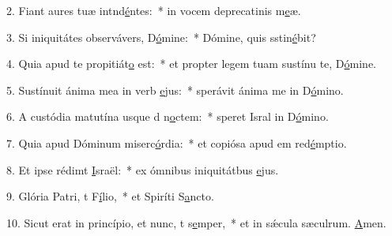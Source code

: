 2. Fiant aures tuæ intnd\uline{é}ntes:~* in vocem deprecatinis m\uline{e}æ.\par 
3. Si iniquitátes observávers, D\uline{ó}mine:~* Dómine, quis sstin\uline{é}bit?\par 
4. Quia apud te propitiát\uline{o} est:~* et propter legem tuam sustínu te, D\uline{ó}mine.\par 
5. Sustínuit ánima mea in verb \uline{e}jus:~* sperávit ánima me in D\uline{ó}mino.\par 
6. A custódia matutína usque d n\uline{o}ctem:~* speret Isral in D\uline{ó}mino.\par 
7. Quia apud Dóminum miserc\uline{ó}rdia:~* et copiósa apud em red\uline{é}mptio.\par 
8. Et ipse rédimt \uline{I}sraël:~* ex ómnibus iniquitátbus \uline{e}jus.\par 
9. Glória Patri, t F\uline{í}lio,~* et Spiríti S\uline{a}ncto.\par 
10. Sicut erat in princípio, et nunc, t s\uline{e}mper,~* et in sǽcula sæculrum. \uline{A}men.\par 
